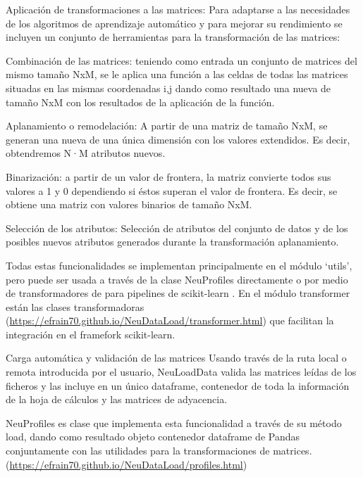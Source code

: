 Aplicación de transformaciones a las matrices:
Para adaptarse a las necesidades de los algoritmos de aprendizaje automático y para mejorar su rendimiento se incluyen un conjunto de herramientas para la transformación de las matrices:

Combinación de las matrices: teniendo como entrada un conjunto de matrices del mismo tamaño NxM, se le aplica una función a las celdas de todas las matrices situadas en las mismas coordenadas i,j dando como resultado una nueva de tamaño NxM con los resultados de la aplicación de la función.

Aplanamiento o remodelación: A partir de una matriz de tamaño NxM, se generan una nueva de una única dimensión con los valores extendidos. Es decir, obtendremos N·M atributos nuevos.

Binarización: a partir de un valor de frontera, la matriz convierte todos sus valores a 1 y 0 dependiendo si éstos superan el valor de frontera. Es decir, se obtiene una matriz con valores binarios de tamaño NxM.

Selección de los atributos: Selección de atributos del conjunto de datos y de los posibles nuevos atributos generados durante la transformación aplanamiento. 

Todas estas funcionalidades se implementan principalmente en el módulo ‘utils’, pero puede ser usada a través de la clase NeuProfiles directamente o por medio de transformadores de para pipelines de scikit-learn \cite{Scikit-learn:Documentation}. En el módulo transformer están las clases transformadoras (\url{https://efrain70.github.io/NeuDataLoad/transformer.html}) que facilitan la integración en el framefork scikit-learn.

Carga automática y validación de las matrices
Usando través de la ruta local o remota introducida por el usuario, NeuLoadData valida las matrices leídas de los ficheros y las incluye en un único dataframe, contenedor de toda la información de la hoja de cálculos y las matrices de adyacencia.

NeuProfiles es clase que implementa esta funcionalidad a través de su método load, dando como resultado objeto contenedor dataframe de Pandas \cite{PythonLibrary} conjuntamente con las utilidades para la transformaciones de matrices. (\url{https://efrain70.github.io/NeuDataLoad/profiles.html})

